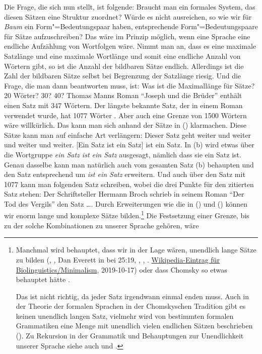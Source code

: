 Die Frage, die sich nun stellt, ist folgende: Braucht man ein formales System, das
diesen Sätzen eine Struktur zuordnet? Würde es nicht ausreichen, so wie wir
für \emph{Baum} ein Form"=Bedeutungspaar haben, entsprechende Form"=Bedeutungspaare
für Sätze aufzuschreiben?\label{Seite-Alle-Sätze-aufschreiben} Das wäre im Prinzip möglich, wenn eine Sprache eine
endliche Aufzählung von Wortfolgen wäre. Nimmt man an,
dass es eine maximale Satzlänge und eine maximale Wortlänge und somit eine endliche
Anzahl von Wörtern gibt, so ist die Anzahl der bildbaren Sätze endlich.
Allerdings ist die Zahl der bildbaren Sätze selbst bei Begrenzung der Satzlänge riesig.
Und die Frage, die man dann beantworten muss, ist: Was ist die Maximallänge für
Sätze? 20 Wörter? 30? 40? Thomas Manns Roman "`Joseph und die Brüder"' enthält einen Satz mit 347 Wörtern. Der längste
bekannte Satz, der in einem Roman verwendet wurde, hat 1077 Wörter \citep{Hug2018a}.
Aber auch eine Grenze von 1500 Wörtern wäre willkürlich. Das kann man sich anhand der Sätze in
() klarmachen. Diese Sätze kann man auf einfache Art verlängern:
\eal
\ex Dieser Satz geht weiter und weiter und weiter und weiter.
\ex {}[Ein Satz ist ein Satz] ist ein Satz.
\zl
In (b) wird etwas über die Wortgruppe \emph{ein Satz ist ein Satz} ausgesagt, nämlich dass sie
ein Satz ist. Genau dasselbe kann man natürlich auch vom gesamten Satz (b) behaupten und den Satz
entsprechend um \emph{ist ein Satz} erweitern. Und auch über den Satz mit 1077 kann man folgenden
Satz schreiben, wobei die drei Punkte für den zitierten Satz stehen: 
\ea
Der Schriftsteller Hermann Broch schrieb in seinem Roman "`Der Tod des Vergils"' den Satz \ldots.
\z
Durch Erweiterungen wie die in () und () können wir enorm lange und komplexe Sätze bilden.\footnote{
Manchmal wird behauptet, dass wir in der Lage wären, unendlich lange Sätze zu bilden (\citealp*[]{NKN2001a}, \citealp[]{KS2008a-u}, Dan Everett in  bei 25:19,
 \citealp*[]{Chesi2015a-u}, \citealp[]{Lin2017a}, \citealp[]{Martorell2018a}.
 \href{https://en.wikipedia.org/wiki/Biolinguistics\#Minimalist_Program}{Wikipedia-Eintrag für
   Biolinguistics/Minimalism}, 2019-10-17)
 oder dass Chomsky so etwas behauptet hätte \citep[]{Leiss2003a}.

Das ist nicht richtig, da jeder Satz irgendwann einmal enden
 muss. Auch in der Theorie der formalen Sprachen in der Chomskyschen Tradition gibt es keinen
 unendlich langen Satz, vielmehr wird von bestimmten formalen Grammatiken eine Menge mit unendlich
 vielen endlichen Sätzen beschrieben (\citealp[]{Chomsky57a}). Zu Rekursion in
 der Grammatik und Behauptungen zur Unendlichkeit unserer Sprache siehe auch  und
 .
} Die Festsetzung einer Grenze, bis zu der solche Kombinationen zu unserer Sprache gehören, wäre
